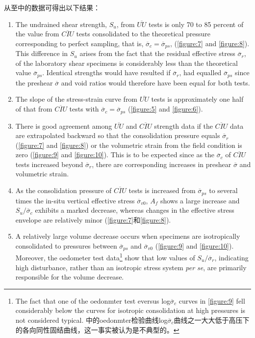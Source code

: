 \begin{paracol}{2}
    \switchcolumn
    
    从至中的数据可得出以下结果：

    \switchcolumn*

    \begin{enumerate}
        \item The undrained shear strength, $S_u$, from $\overline{UU}$ tests is only 70 to 85 percent of the value from $\overline{CIU}$ tests consolidated to the theoretical pressure corresponding to perfect sampling, that is, $\overline{\sigma}_c=\overline{\sigma}_{ps}$, (\autoref{figure:7} and \autoref{figure:8}). This difference in $S_u$ arises from the fact that the residual effective stress $\overline{\sigma}_r$, of the laboratory shear specimens is considerably less than the theoretical value $\overline{\sigma}_{ps}$. Identical strengths would have resulted if $\overline{\sigma}_r$, had equalled $\overline{\sigma}_{ps}$ since the preshear $\overline{\sigma}$ and void ratios would therefore have been equal for both tests.
        \item The slope of the stress-strain curve from $\overline{UU}$ tests is approximately one half of that from $\overline{CIU}$ tests with $\overline{\sigma}_c=\overline{\sigma}_{ps}$ (\autoref{figure:5} and \autoref{figure:6}).
        \item  There is good agreement among $\overline{UU}$ and $\overline{CIU}$ strength data if the $\overline{CIU}$ data are extrapolated backward so that the consolidation pressure equals $\overline{\sigma}_r$ (\autoref{figure:7} and \autoref{figure:8}) or the volumetric strain from the field condition is zero (\autoref{figure:9} and \autoref{figure:10}). This is to be expected since as the $\overline{\sigma}_c$ of $\overline{CIU}$ tests increased beyond $\overline{\sigma}_r$, there are corresponding increases in preshear $\overline{\sigma}$ and volumetric strain.
        \item As the consolidation pressure of $\overline{CIU}$ tests is increased from $\overline{\sigma}_{ps}$ to several times the in-situ vertical effective stress $\overline{\sigma}_{v0}$, $A_f$ shows a large increase and $S_u/\overline{\sigma}_c$ exhibits a marked decrease, whereas changes in the effective stress envelope are relatively minor (\autoref{figure:7}和\autoref{figure:8}).
        \item A relatively large volume decrease occurs when specimens are isotropically consolidated to pressures between $\overline{\sigma}_{ps}$ and $\overline{\sigma}_{v0}$ (\autoref{figure:9} and \autoref{figure:10}). Moreover, the oedometer test data\footnote{
        The fact that one of the oedonmter test eversus log$\overline{\sigma}_c$ curves in \autoref{figure:9} fell considerably below the curves for isotropic consolidation at high pressures is not considered typical. 中的oedonmter检验曲线log$\overline{\sigma}_c$曲线之一大大低于高压下的各向同性固结曲线，这一事实被认为是不典型的。
    } show that low values of $S_u/\overline{\sigma}_r$, indicating high disturbance, rather than an isotropic stress system \textit{per se}, are primarily responsible for the volume decrease.
    \end{enumerate}


\end{paracol}
